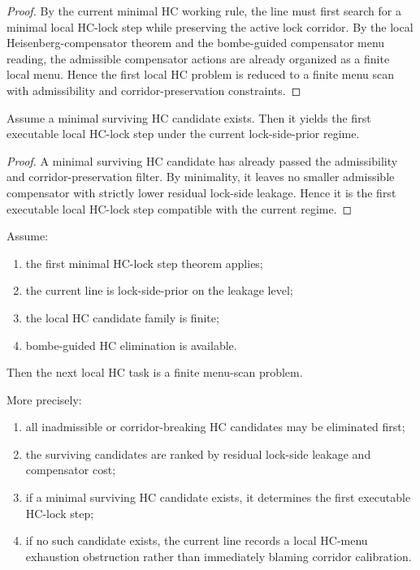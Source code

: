 \begin{proof}
By the current minimal HC working rule, the line must first search for a minimal local HC-lock step while preserving the active lock corridor. By the local Heisenberg-compensator theorem and the bombe-guided compensator menu reading, the admissible compensator actions are already organized as a finite local menu. Hence the first local HC problem is reduced to a finite menu scan with admissibility and corridor-preservation constraints.
\end{proof}

\begin{lemma}
\label{lem:minimal-surviving-hc-candidate-yields-first-executable-hc-lock-step}
Assume a minimal surviving HC candidate exists. Then it yields the first executable local HC-lock step under the current lock-side-prior regime.
\end{lemma}

\begin{proof}
A minimal surviving HC candidate has already passed the admissibility and corridor-preservation filter. By minimality, it leaves no smaller admissible compensator with strictly lower residual lock-side leakage. Hence it is the first executable local HC-lock step compatible with the current regime.
\end{proof}

\begin{theorem}
\label{thm:first-local-hc-menu-scan-theorem}
Assume:
\begin{enumerate}[leftmargin=2em,label=(\alph*)]
  \item the first minimal HC-lock step theorem applies;
  \item the current line is lock-side-prior on the leakage level;
  \item the local HC candidate family is finite;
  \item bombe-guided HC elimination is available.
\end{enumerate}
Then the next local HC task is a finite menu-scan problem.

More precisely:
\begin{enumerate}[leftmargin=2em,label=(\roman*)]
  \item all inadmissible or corridor-breaking HC candidates may be eliminated first;
  \item the surviving candidates are ranked by residual lock-side leakage and compensator cost;
  \item if a minimal surviving HC candidate exists, it determines the first executable HC-lock step;
  \item if no such candidate exists, the current line records a local HC-menu exhaustion obstruction rather than immediately blaming corridor calibration.
\end{enumerate}
\end{theorem}

